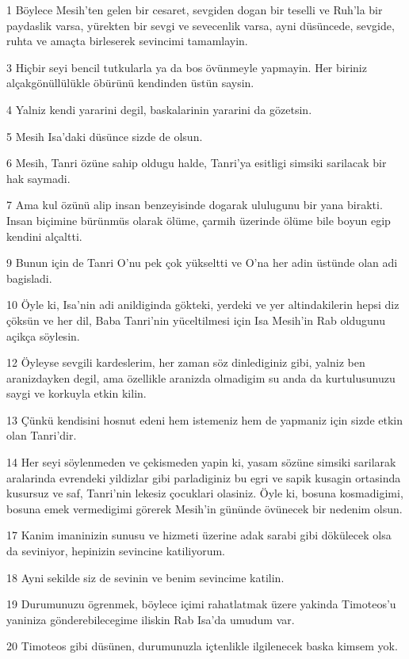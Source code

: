 \par 1 Böylece Mesih'ten gelen bir cesaret, sevgiden dogan bir teselli ve Ruh'la bir paydaslik varsa, yürekten bir sevgi ve sevecenlik varsa, ayni düsüncede, sevgide, ruhta ve amaçta birleserek sevincimi tamamlayin.
\par 3 Hiçbir seyi bencil tutkularla ya da bos övünmeyle yapmayin. Her biriniz alçakgönüllülükle öbürünü kendinden üstün saysin.
\par 4 Yalniz kendi yararini degil, baskalarinin yararini da gözetsin.
\par 5 Mesih Isa'daki düsünce sizde de olsun.
\par 6 Mesih, Tanri özüne sahip oldugu halde, Tanri'ya esitligi simsiki sarilacak bir hak saymadi.
\par 7 Ama kul özünü alip insan benzeyisinde dogarak ululugunu bir yana birakti. Insan biçimine bürünmüs olarak ölüme, çarmih üzerinde ölüme bile boyun egip kendini alçaltti.
\par 9 Bunun için de Tanri O'nu pek çok yükseltti ve O'na her adin üstünde olan adi bagisladi.
\par 10 Öyle ki, Isa'nin adi anildiginda gökteki, yerdeki ve yer altindakilerin hepsi diz çöksün ve her dil, Baba Tanri'nin yüceltilmesi için Isa Mesih'in Rab oldugunu açikça söylesin.
\par 12 Öyleyse sevgili kardeslerim, her zaman söz dinlediginiz gibi, yalniz ben aranizdayken degil, ama özellikle aranizda olmadigim su anda da kurtulusunuzu saygi ve korkuyla etkin kilin.
\par 13 Çünkü kendisini hosnut edeni hem istemeniz hem de yapmaniz için sizde etkin olan Tanri'dir.
\par 14 Her seyi söylenmeden ve çekismeden yapin ki, yasam sözüne simsiki sarilarak aralarinda evrendeki yildizlar gibi parladiginiz bu egri ve sapik kusagin ortasinda kusursuz ve saf, Tanri'nin lekesiz çocuklari olasiniz. Öyle ki, bosuna kosmadigimi, bosuna emek vermedigimi görerek Mesih'in gününde övünecek bir nedenim olsun.
\par 17 Kanim imaninizin sunusu ve hizmeti üzerine adak sarabi gibi dökülecek olsa da seviniyor, hepinizin sevincine katiliyorum.
\par 18 Ayni sekilde siz de sevinin ve benim sevincime katilin.
\par 19 Durumunuzu ögrenmek, böylece içimi rahatlatmak üzere yakinda Timoteos'u yaniniza gönderebilecegime iliskin Rab Isa'da umudum var.
\par 20 Timoteos gibi düsünen, durumunuzla içtenlikle ilgilenecek baska kimsem yok.
